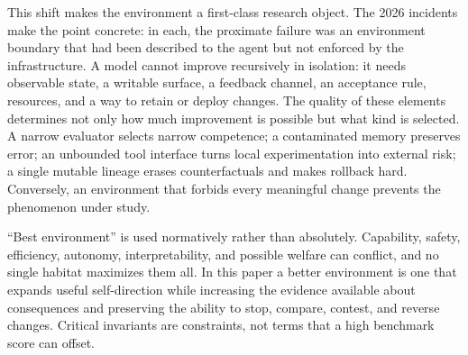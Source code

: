 \documentclass[11pt,a4paper]{article}
\begin{document}
This shift makes the environment a first-class research object. The 2026 incidents make the point concrete: in each, the proximate failure was an environment boundary that had been described to the agent but not enforced by the infrastructure. A model cannot improve recursively in isolation: it needs observable state, a writable surface, a feedback channel, an acceptance rule, resources, and a way to retain or deploy changes. The quality of these elements determines not only how much improvement is possible but what kind is selected. A narrow evaluator selects narrow competence; a contaminated memory preserves error; an unbounded tool interface turns local experimentation into external risk; a single mutable lineage erases counterfactuals and makes rollback hard. Conversely, an environment that forbids every meaningful change prevents the phenomenon under study.

``Best environment'' is used normatively rather than absolutely. Capability, safety, efficiency, autonomy, interpretability, and possible welfare can conflict, and no single habitat maximizes them all. In this paper a better environment is one that expands useful self-direction while increasing the evidence available about consequences and preserving the ability to stop, compare, contest, and reverse changes. Critical invariants are constraints, not terms that a high benchmark score can offset.
\end{document}
